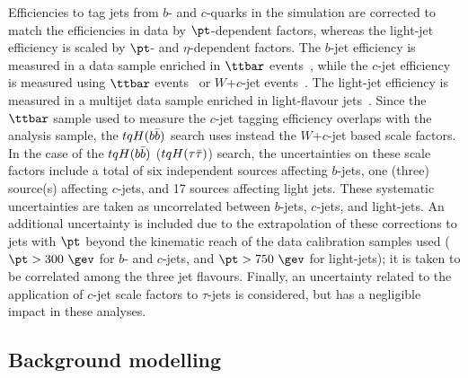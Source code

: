 Efficiencies to tag jets from $b$- and $c$-quarks in the simulation are corrected to match the efficiencies in data by $\pt$-dependent factors,
whereas the light-jet efficiency is scaled by $\pt$- and $\eta$-dependent factors.
The $b$-jet efficiency is measured in a data sample enriched in $\ttbar$ events~\cite{Aaboud:2018xwy}, while the $c$-jet efficiency is measured
using $\ttbar$ events~\cite{ATLAS-CONF-2018-001} or $W$+$c$-jet events~\cite{Aad:2015ydr}. The light-jet efficiency 
is measured in a multijet data sample enriched in light-flavour jets~\cite{ATLAS-CONF-2018-006}.
Since the $\ttbar$ sample used to measure the $c$-jet tagging efficiency overlaps with the analysis sample, the $tqH(b\bar{b})$ search uses
instead the $W$+$c$-jet based scale factors.  
In the case of the $tqH(b\bar{b})$ ($tqH(\tau\bar{\tau})$) search, the uncertainties on these scale factors include a total of six independent sources affecting $b$-jets, one (three) source(s) affecting $c$-jets, and 17 sources affecting light jets. 
These systematic uncertainties are taken as uncorrelated between $b$-jets, $c$-jets, and light-jets. 
An additional uncertainty is included due to the extrapolation of these corrections to jets 
with $\pt$ beyond the kinematic reach of the data calibration samples used ($\pt>300~\gev$ for $b$- and $c$-jets, 
and $\pt>750~\gev$ for light-jets); it is taken to be correlated among the three jet flavours. 
Finally, an uncertainty related to the application of $c$-jet scale factors to $\tau$-jets is considered,
but has a negligible impact in these analyses.

\subsection{Background modelling}
\label{sec:syst_bkgmodeling}

